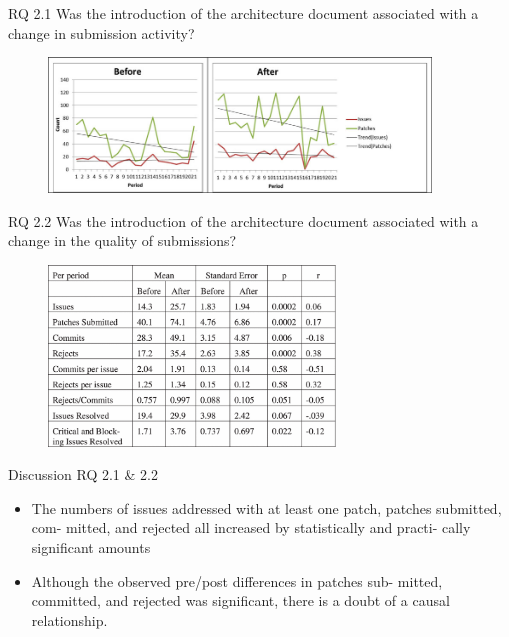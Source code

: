 \documentclass[t,14pt,mathserif]{beamer}
\begin{document}
\begin{frame}{RQ 2.1 Was the introduction of the architecture document associated with a change in submission activity?}
	
	\begin{figure}[!t]
		\centering
		\includegraphics[width=4.0in]{../img/issue-patch}
		\label{fig:issue-patch}
	\end{figure}
	
\end{frame}


\begin{frame}{RQ 2.2 Was the introduction of the architecture document associated with a change in the quality of submissions?}
	
	\begin{figure}[!t]
		\centering
		\includegraphics[width=3.0in]{../img/issue-quality-table}
		\label{fig:issue-quality-table}
	\end{figure}
	
\end{frame}

\begin{frame}{Discussion RQ 2.1 \& 2.2}
	\begin{itemize}
	\item The numbers of issues addressed with at least one patch, patches submitted, com- mitted, and rejected all increased by statistically and practi- cally significant amounts
	\item Although the observed pre/post differences in patches sub- mitted, committed, and rejected was significant, there is a doubt of a causal relationship.
	\end{itemize}

\end{frame}
\end{document}
